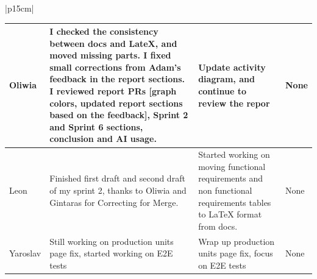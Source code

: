 \begin{table}[H]
    \centering
    \begin{tabular}{|p{15cm}|} 
        \hline
        \begin{table}[H]
            \begin{tabular}{|p{1.75cm}|p{4cm}|p{4cm}|p{4cm}|}
                \hline
                \cellcolor[HTML]{d4d4d4} Oliwia & I checked the consistency between docs and LateX, and moved missing parts. I fixed small corrections from Adam’s feedback in the report sections. I reviewed report PRs [graph colors, updated report sections based on the feedback], Sprint 2 and Sprint 6 sections, conclusion and AI usage.  & Update activity diagram, and continue to review the repor & None \\
                \hline
                \cellcolor[HTML]{d4d4d4} Leon & Finished first draft and second draft of my sprint 2, thanks to Oliwia and Gintaras for Correcting for Merge. & Started working on moving functional requirements and non functional requirements tables to LaTeX format from docs. & None \\
                \hline
                \cellcolor[HTML]{d4d4d4} Yaroslav & Still working on production units page fix, started working on E2E tests  & Wrap up production units page fix, focus on E2E tests & None \\
                \hline
            \end{tabular}
        \end{table}
        \\
        \hline
    \end{tabular}
\end{table}

